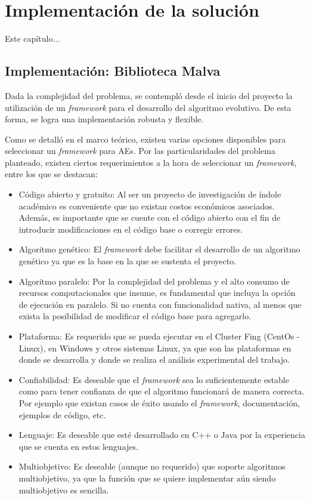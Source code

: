 \chapter{Implementación de la solución}

Este capítulo...


\section{Implementación: Biblioteca Malva}

Dada la complejidad del problema, se contempló desde el inicio del proyecto la utilización de un \emph{framework} para el desarrollo del algoritmo evolutivo. De esta forma, se logra una implementación robusta y flexible. 

Como se detalló en el marco teórico, existen varias opciones disponibles para seleccionar un \emph{framework} para AEs. Por las particularidades del problema planteado, existen ciertos requerimientos a la hora de seleccionar un \emph{framework}, entre los que se destacan:

\begin{itemize}
	\item Código abierto y gratuito: Al ser un proyecto de investigación de índole académico es conveniente que no existan costos económicos asociados. Además, es importante que se cuente con el código abierto con el fin de introducir modificaciones en el código base o corregir errores.
	\item Algoritmo genético: El \emph{framework} debe facilitar el desarrollo de un algoritmo genético ya que es la base en la que se sustenta el proyecto.
	\item Algoritmo paralelo: Por la complejidad del problema y el alto consumo de recursos computacionales que insume, es fundamental que incluya la opción de ejecución en paralelo. Si no cuenta con funcionalidad nativa, al menos que exista la posibilidad de modificar el código base para agregarlo.
	\item Plataforma: Es requerido que se pueda ejecutar en el Cluster Fing (CentOs - Linux), en Windows y otros sistemas Linux, ya que son las plataformas en donde se desarrolla y donde se realiza el análisis experimental del trabajo.
	\item Confiabilidad: Es deseable que el \emph{framework} sea lo suficientemente estable como para tener confianza de que el algoritmo funcionará de manera correcta. Por ejemplo que existan casos de éxito usando el \emph{framework}, documentación, ejemplos de código, etc.
	\item Lenguaje: Es deseable que esté desarrollado en C++ o Java por la experiencia que se cuenta en estos lenguajes. 
	\item Multiobjetivo: Es deseable (aunque no requerido) que soporte algoritmos multiobjetivo, ya que la función que se quiere implementar aún siendo multiobjetivo es sencilla.	
\end{itemize} 

